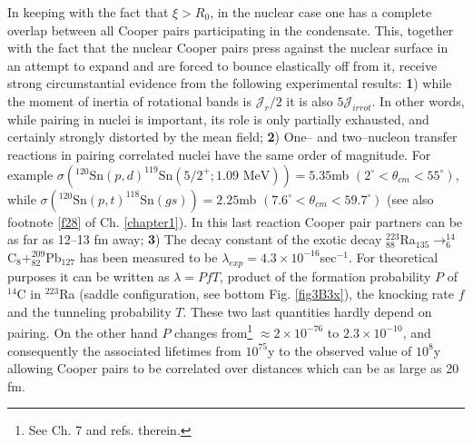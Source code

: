 \begin{subappendices}
 
 In keeping with the fact that $\xi>R_0$, in the nuclear case one has a complete overlap between all Cooper pairs participating in the condensate. This, together with the fact that the nuclear Cooper pairs press against the nuclear surface in an attempt to expand and are forced to bounce elastically off from  it, receive strong circumstantial evidence from the following experimental results: \textbf{1}) while the moment of inertia of rotational bands is $\mathcal J_r/2$ it is also $5 \mathcal J_{irrot}$. In other words, while pairing in nuclei is important, its role is only partially exhausted, and certainly strongly distorted by the mean field; \textbf{2}) One-- and two--nucleon transfer reactions in pairing correlated nuclei have the same order of magnitude. For example $\sigma (^{120}\text{Sn}(p,d)^{119}\text{Sn}(5/2^+; 1.09 \text{ MeV}))=5.35 $mb $(2^\circ<\theta_{cm}<55^\circ)$, while $\sigma (^{120}\text{Sn}(p,t)^{118}\text{Sn}(gs))=2.25 $mb $(7.6^\circ<\theta_{cm}<59.7^\circ)$ (see also footnote \ref{f28} of  Ch. \ref{chapter1}). In this last reaction Cooper pair partners can be as far as 12--13 fm away; \textbf{3}) The decay constant of the exotic decay $^{223}_{88}$Ra$_{135}\rightarrow^{14}_6$C$_8+^{209}_{82}$Pb$_{127}$ has been measured to be $\lambda_{exp}=4.3\times10^{-16}$sec$^{-1}$. For theoretical purposes it can be written as $\lambda=PfT$, product of the formation probability $P$ of $^{14}$C in $^{223}$Ra (saddle configuration, see bottom Fig. \ref{fig3B3x}), the knocking rate $f$ and the tunneling probability $T$. These two last quantities hardly depend on pairing. On the other hand $P$ changes from\footnote{See \cite{Brink:05} Ch. 7 and refs. therein.} $\approx 2\times10^{-76}$ to $2.3\times10^{-10}$, and consequently the associated lifetimes from $10^{75}$y to the observed value of $10^8$y  allowing Cooper pairs to be correlated over distances which can be as large as 20 fm.
 

\end{subappendices}
